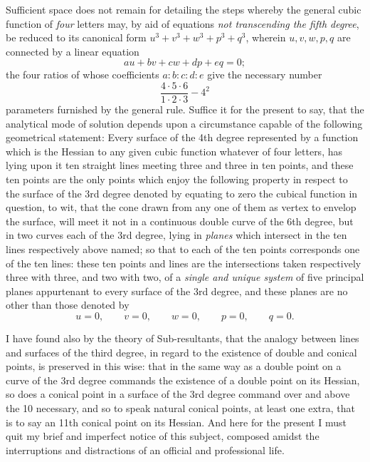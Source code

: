 \documentclass[11pt]{article}
\newcommand{\sourcepage}[1]{\marginpar{\scriptsize p.~#1}}
\begin{document}
{{Sufficient space does not remain for detailing the steps whereby the general cubic function of \emph{four} letters may, by aid of equations \emph{not transcending the fifth degree}, be reduced to its canonical form $u^3+v^3+w^3+p^3+q^3$, wherein $u,v,w,p,q$ are connected by a linear equation
\[
 au+bv+cw+dp+eq=0;
\]
the four ratios of whose coefficients $a:b:c:d:e$ give the necessary number
\[
 \frac{4\cdot5\cdot6}{1\cdot2\cdot3}-4^2
\]
parameters furnished by the general rule. Suffice it for the present to say, that the analytical mode of solution depends upon a circumstance capable of the following geometrical statement: Every surface of the 4th degree represented by a function which is the Hessian to any given cubic function whatever of four letters, has lying upon it ten straight lines meeting three and three in ten points, and these ten points are the only points which enjoy the following property in respect to the surface of the 3rd degree denoted by equating to zero the cubical function in question, to wit, that the cone drawn from any one of them as vertex to envelop the surface, will meet it not in a continuous double curve of the 6th degree, but in two curves each of the 3rd degree, lying in \emph{planes} which intersect in the ten lines respectively above named; so that to each of the ten points corresponds one of the ten lines: these ten points and lines are the intersections taken respectively three with three, and two with two, of a \emph{single and unique system} of five principal planes appurtenant to every surface of the 3rd degree, and these planes are no other than those denoted by
\[
 u=0,\qquad v=0,\qquad w=0,\qquad p=0,\qquad q=0.
\]

\sourcepage{196}
I have found also by the theory of Sub-resultants, that the analogy between lines and surfaces of the third degree, in regard to the existence of double and conical points, is preserved in this wise: that in the same way as a double point on a curve of the 3rd degree commands the existence of a double point on its Hessian, so does a conical point in a surface of the 3rd degree command over and above the 10 necessary, and so to speak natural conical points, at least one extra, that is to say an 11th conical point on its Hessian. And here for the present I must quit my brief and imperfect notice of this subject, composed amidst the interruptions and distractions of an official and professional life.

}}
\end{document}

